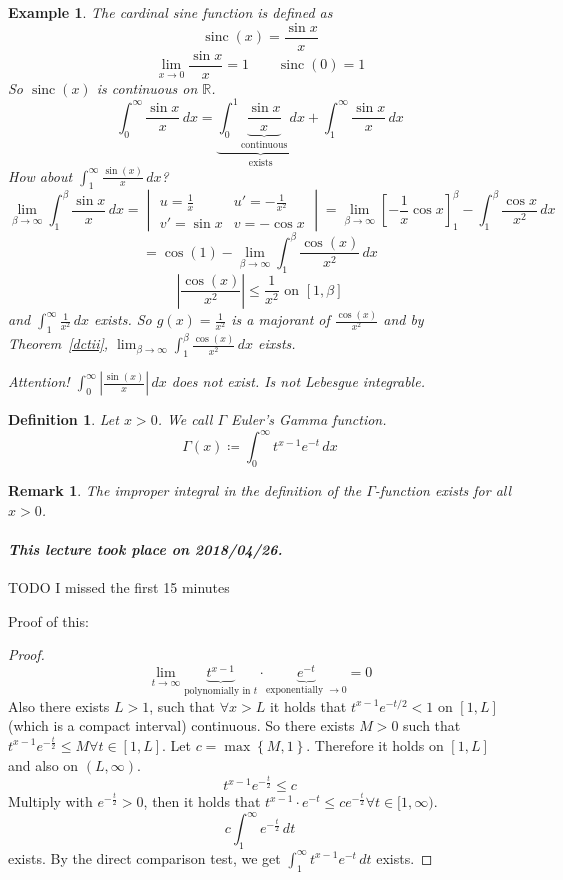 \documentclass{article}
\newtheorem{example}{Example}  \numberwithin{example}{section}
\newtheorem{definition}{Definition}  \numberwithin{definition}{section}
\newtheorem{remark}{Remark}  \numberwithin{remark}{section}
\newcommand{\set}[1]{\left\{#1\right\}}
\newcommand{\card}[1]{\left|#1\right|}
\newcommand{\dateref}[1]{\paragraph{\textit{This lecture took place on #1.}}}
\DeclareMathOperator{\sinc}{sinc}
\begin{document}
\begin{example}
  The cardinal sine function is defined as
  \[ \sinc(x) = \frac{\sin{x}}{x} \]
  \[ \lim_{x\to 0} \frac{\sin{x}}{x} = 1 \qquad \sinc(0) = 1 \]
  So $\sinc(x)$ is continuous on $\mathbb R$.
  \[ \int_0^\infty \frac{\sin{x}}{x} \, dx = \underbrace{\int_0^1 \underbrace{\frac{\sin{x}}{x}}_{\text{continuous}} \, dx}_{\text{exists}} + \int_1^\infty \frac{\sin{x}}{x} \, dx \]
  How about $\int_1^\infty \frac{\sin(x)}{x} \, dx$?
  \[
    \lim_{\beta\to\infty} \int_1^\beta \frac{\sin{x}}{x} \, dx =
      \begin{vmatrix}
        u = \frac1x & u' = -\frac1{x^2} \\
        v' = \sin{x} & v = -\cos{x}
      \end{vmatrix}
      = \lim_{\beta\to\infty} \left[
        -\frac1x \cos{x}
      \right]_1^\beta - \int_1^\beta \frac{\cos{x}}{x^2} \, dx
  \] \[
    = \cos(1) - \lim_{\beta\to\infty} \int_1^\beta \frac{\cos(x)}{x^2} \, dx
  \] \[
    \card{\frac{\cos(x)}{x^2}} \leq \frac1{x^2} \text{ on } [1, \beta]
  \]
  and $\int_1^\infty \frac1{x^2} \, dx$ exists.
  So $g(x) = \frac1{x^2}$ is a majorant of $\frac{\cos(x)}{x^2}$ and by Theorem~\ref{dctii},
  $\lim_{\beta\to\infty} \int_1^\beta \frac{\cos(x)}{x^2} \, dx$ eixsts.

  Attention! $\int_0^\infty \card{\frac{\sin(x)}{x}} \, dx$ does not exist. Is not Lebesgue integrable.
\end{example}

\begin{definition} %
  Let $x > 0$.
  We call $\Gamma$ \emph{Euler's Gamma function}.
  \[ \Gamma(x) \coloneqq \int_0^\infty t^{x - 1} e^{-t} \, dx \]
\end{definition}

\begin{remark}
  The improper integral in the definition of the $\Gamma$-function exists for all $x > 0$.
\end{remark}

\dateref{2018/04/26}

TODO I missed the first 15 minutes

Proof of this:
\begin{proof}
  \[ \lim_{t\to\infty} \underbrace{t^{x-1}}_{\text{polynomially in } t} \cdot \underbrace{e^{-t}}_{\text{exponentially } \to 0} = 0 \]
  Also there exists $L > 1$, such that $\forall x > L$ it holds that $t^{x-1} e^{-t/2} < 1$ on $[1,L]$ (which is a compact interval) continuous.
  So there exists $M > 0$ such that $t^{x-1} e^{-\frac t2} \leq M \forall t \in [1,L]$.
  Let $c = \max\set{M, 1}$. Therefore it holds on $[1,L]$ and also on $(L,\infty)$.
  \[ t^{x-1} e^{-\frac t2} \leq c \]
  Multiply with $e^{-\frac t2} > 0$, then it holds that $t^{x-1} \cdot e^{-t} \leq ce^{-\frac t2} \forall t \in [1,\infty)$.
  \[ c \int_1^\infty e^{-\frac t2} \, dt \]
  exists.
  By the direct comparison test, we get $\int_1^\infty t^{x-1} e^{-t} \, dt$ exists.
\end{proof}
\end{document}
